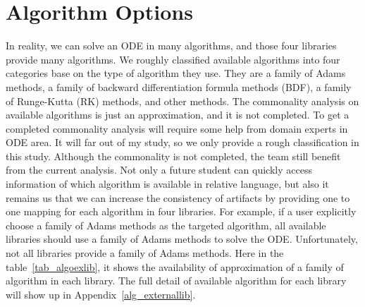 \section{Algorithm Options}
In reality, we can solve an ODE in many algorithms, and those four libraries provide many algorithms. We roughly classified available algorithms into four categories base on the type of algorithm they use. They are a family of Adams methods, a family of backward differentiation formula methods (BDF), a family of Runge-Kutta (RK) methods, and other methods. The commonality analysis on available algorithms is just an approximation, and it is not completed. To get a completed commonality analysis will require some help from domain experts in ODE area. It will far out of my study, so we only provide a rough classification in this study. Although the commonality is not completed, the team still benefit from the current analysis. Not only a future student can quickly access information of which algorithm is available in relative language, but also it remains us that we can increase the consistency of artifacts by providing one to one mapping for each algorithm in four libraries. For example, if a user explicitly choose a family of Adams methods as the targeted algorithm, all available libraries should use a family of Adams methods to solve the ODE. Unfortunately, not all libraries provide a family of Adams methods. Here in the table~\ref{tab_algoexlib}, it shows the availability of approximation of a family of algorithm in each library. The full detail of available algorithm for each library will show up in Appendix~\ref{alg_externallib}.

